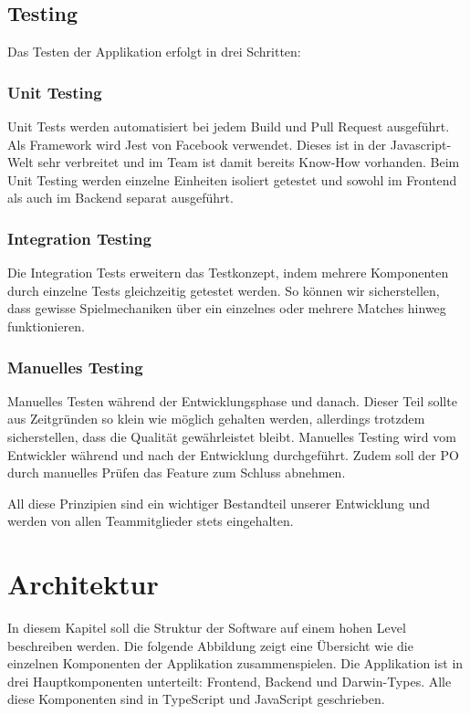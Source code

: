 \documentclass[11pt,a4paper]{scrartcl}
\let\oldsection\section
\renewcommand\section{\clearpage\oldsection}
\begin{document}
\subsection{Testing}
Das Testen der Applikation erfolgt in drei Schritten:

\subsubsection{Unit Testing}
Unit Tests werden automatisiert bei jedem Build und Pull Request ausgeführt.
Als Framework wird Jest von Facebook verwendet. Dieses ist in der Javascript-Welt sehr verbreitet und im Team ist damit bereits Know-How vorhanden.
Beim Unit Testing werden einzelne Einheiten isoliert getestet und sowohl im Frontend als auch im Backend separat ausgeführt.

\subsubsection{Integration Testing}
Die Integration Tests erweitern das Testkonzept, indem mehrere Komponenten durch einzelne Tests gleichzeitig getestet werden. So können wir sicherstellen, dass gewisse Spielmechaniken über ein einzelnes oder mehrere Matches hinweg funktionieren.

\subsubsection{Manuelles Testing}
Manuelles Testen während der Entwicklungsphase und danach. Dieser Teil sollte aus Zeitgründen so klein wie möglich gehalten werden, allerdings trotzdem sicherstellen, dass die Qualität gewährleistet bleibt. Manuelles Testing wird vom Entwickler während und nach der Entwicklung durchgeführt.
Zudem soll der PO durch manuelles Prüfen das Feature zum Schluss abnehmen.

All diese Prinzipien sind ein wichtiger Bestandteil unserer Entwicklung und werden von allen Teammitglieder stets eingehalten.

\section{Architektur}
In diesem Kapitel soll die Struktur der Software auf einem hohen Level beschreiben werden. Die folgende Abbildung zeigt eine Übersicht wie die einzelnen Komponenten der Applikation zusammenspielen.
Die Applikation ist in drei Hauptkomponenten unterteilt: Frontend, Backend und Darwin-Types. Alle diese Komponenten sind in TypeScript und JavaScript geschrieben. 
\end{document}
